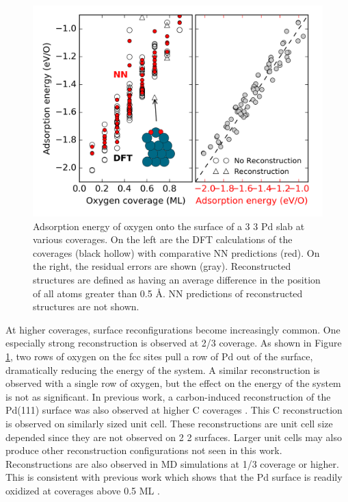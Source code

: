 \documentclass[12pt,oneside]{cmuthesis}
\begin{document}
\begin{figure}[htbp]
\centering
\includegraphics[width=5.5in]{./images/coverage-dependance.png}
\caption{\label{fig-PdO-thermo-coverage}
Adsorption energy of oxygen onto the surface of a 3 \texttimes{} 3 Pd slab at various coverages. On the left are the DFT calculations of the coverages (black hollow) with comparative NN predictions (red). On the right, the residual errors are shown (gray). Reconstructed structures are defined as having an average difference in the position of all atoms greater than 0.5 \AA{}. NN predictions of reconstructed structures are not shown.}
\end{figure}

At higher coverages, surface reconfigurations become increasingly common. One especially strong reconstruction is observed at 2/3 coverage. As shown in Figure \ref{fig-PdO-thermo-coverage}, two rows of oxygen on the fcc sites pull a row of Pd out of the surface, dramatically reducing the energy of the system. A similar reconstruction is observed with a single row of oxygen, but the effect on the energy of the system is not as significant. In previous work, a carbon-induced reconstruction of the Pd(111) surface was also observed at higher C coverages \cite{kitchin-2009-correl-cover}. This C reconstruction is observed on similarly sized unit cell. These reconstructions are unit cell size depended since they are not observed on 2 \texttimes{} 2 surfaces. Larger unit cells may also produce other reconstruction configurations not seen in this work. Reconstructions are also observed in MD simulations at 1/3 coverage or higher. This is consistent with previous work which shows that the Pd surface is readily oxidized at coverages above 0.5 ML \cite{lundgren-2002-two-dimen,todorova-2004-oxygen-overl}.
\end{document}
